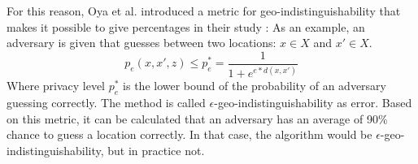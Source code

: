 For this reason, Oya et al. introduced a metric for geo-indistinguishability that makes it possible to give percentages in their study \citep{oya_is_2017}:
As an example, an adversary is given that guesses between two locations: $x \in X$ and  $x' \in X$.
\begin{equation}
  p_e (x, x', z) \leq p^*_e = \frac{1}{1 + e^{e * d(x, x')}}
  \label{eq:geo-as-an-error}
\end{equation}
Where privacy level $p^*_e$ is the lower bound of the probability of an adversary guessing correctly.
The method is called $\epsilon$-geo-indistinguishability as error.
Based on this metric, it can be calculated that an adversary has an average of 90\% chance to guess a location correctly.
In that case, the algorithm would be $\epsilon$-geo-indistinguishability, but in practice not.